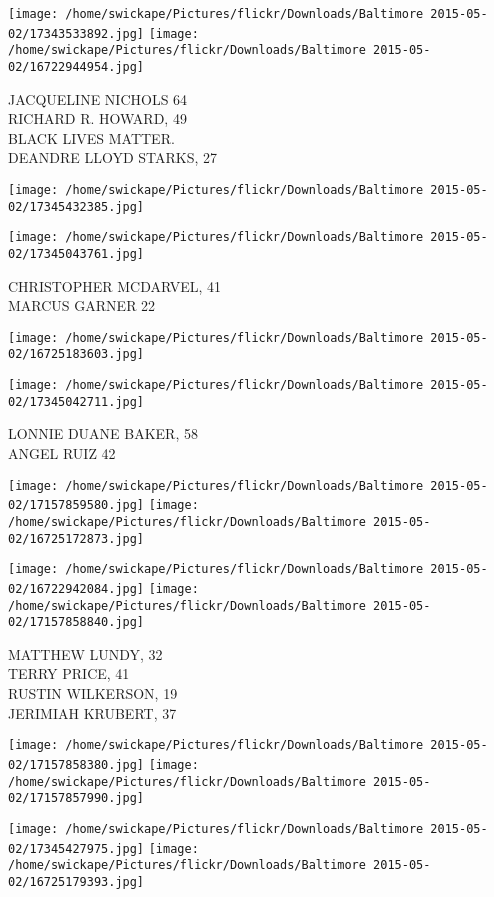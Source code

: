 \documentclass[10pt,letterpaper]{article}
\begin{document}
\texttt{[image: /home/swickape/Pictures/flickr/Downloads/Baltimore 2015-05-02/17343533892.jpg]}
\texttt{[image: /home/swickape/Pictures/flickr/Downloads/Baltimore 2015-05-02/16722944954.jpg]}

JACQUELINE NICHOLS 64\\
RICHARD R. HOWARD, 49\\
BLACK LIVES MATTER.\\
DEANDRE LLOYD STARKS, 27
\pagebreak

\texttt{[image: /home/swickape/Pictures/flickr/Downloads/Baltimore 2015-05-02/17345432385.jpg]}

\vspace{0.25in}
\texttt{[image: /home/swickape/Pictures/flickr/Downloads/Baltimore 2015-05-02/17345043761.jpg]}

CHRISTOPHER MCDARVEL, 41\\
MARCUS GARNER 22
\pagebreak

\texttt{[image: /home/swickape/Pictures/flickr/Downloads/Baltimore 2015-05-02/16725183603.jpg]}

\vspace{0.25in}
\texttt{[image: /home/swickape/Pictures/flickr/Downloads/Baltimore 2015-05-02/17345042711.jpg]}

LONNIE DUANE BAKER, 58\\
ANGEL RUIZ 42
\pagebreak

\texttt{[image: /home/swickape/Pictures/flickr/Downloads/Baltimore 2015-05-02/17157859580.jpg]}
\texttt{[image: /home/swickape/Pictures/flickr/Downloads/Baltimore 2015-05-02/16725172873.jpg]}

\texttt{[image: /home/swickape/Pictures/flickr/Downloads/Baltimore 2015-05-02/16722942084.jpg]}
\texttt{[image: /home/swickape/Pictures/flickr/Downloads/Baltimore 2015-05-02/17157858840.jpg]}

MATTHEW LUNDY, 32\\
TERRY PRICE, 41\\
RUSTIN WILKERSON, 19\\
JERIMIAH KRUBERT, 37
\pagebreak

\texttt{[image: /home/swickape/Pictures/flickr/Downloads/Baltimore 2015-05-02/17157858380.jpg]}
\texttt{[image: /home/swickape/Pictures/flickr/Downloads/Baltimore 2015-05-02/17157857990.jpg]}

\texttt{[image: /home/swickape/Pictures/flickr/Downloads/Baltimore 2015-05-02/17345427975.jpg]}
\texttt{[image: /home/swickape/Pictures/flickr/Downloads/Baltimore 2015-05-02/16725179393.jpg]}
\end{document}
